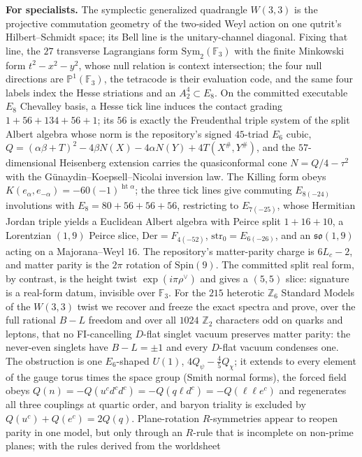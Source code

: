 \documentclass[11pt,twoside]{article}
\theoremstyle{plain}
\theoremstyle{definition}
\theoremstyle{remark}
\newcommand{\F}{\mathbb{F}}
\newcommand{\Z}{\mathbb{Z}}
\newcommand{\W}{W(3,3)}
\begin{document}
\medskip
\textbf{For specialists.} The symplectic generalized quadrangle $\W$ is the projective
commutation geometry of the two-sided Weyl action on one qutrit's Hilbert--Schmidt
space; its Bell line is the unitary-channel diagonal. Fixing that line, the
$27$ transverse Lagrangians form $\mathrm{Sym}_2(\F_3)$ with the finite Minkowski form
$t^2-x^2-y^2$, whose null relation is context intersection; the four null directions
are $\mathbb{P}^1(\F_3)$, the tetracode is their evaluation code, and the same four
labels index the Hesse striations and an $A_2^4\subset E_8$. On the committed
executable $E_8$ Chevalley basis, a Hesse tick line induces the contact grading
$1+56+134+56+1$; its $56$ is exactly the Freudenthal triple system of the split Albert
algebra whose norm is the repository's signed $45$-triad $E_6$ cubic,
$Q=(\alpha\beta+T)^2-4\beta N(X)-4\alpha N(Y)+4T(X^\#,Y^\#)$, and the $57$-dimensional
Heisenberg extension carries the quasiconformal cone $N=Q/4-\tau^2$ with the
G\"unaydin--Koepsell--Nicolai inversion law. The Killing form obeys
$K(e_\alpha,e_{-\alpha})=-60(-1)^{\operatorname{ht}\alpha}$; the three tick lines give
commuting $E_{8(-24)}$ involutions with $E_8=80+56+56+56$, restricting to $E_{7(-25)}$,
whose Hermitian Jordan triple yields a Euclidean Albert algebra with Peirce split
$1+16+10$, a Lorentzian $(1,9)$ Peirce slice, $\mathrm{Der}=F_{4(-52)}$,
$\mathrm{str}_0=E_{6(-26)}$, and an $\mathfrak{so}(1,9)$ acting on a Majorana--Weyl $16$.
The repository's matter-parity charge is $6L_c-2$, and matter parity is the $2\pi$
rotation of $\mathrm{Spin}(9)$. The committed split real form, by contrast, is the
height twist $\exp(i\pi\rho^\vee)$ and gives a $(5,5)$ slice: signature is a real-form
datum, invisible over $\F_3$. For the $215$ heterotic $\Z_6$ Standard Models of the $\W$
twist we recover and freeze the exact spectra and prove, over the full rational $B-L$
freedom and over all $1024$ $\Z_2$ characters odd on quarks and leptons, that no
FI-cancelling $D$-flat singlet vacuum preserves matter parity: the never-even singlets have
$B-L=\pm1$ and every $D$-flat vacuum condenses one. The obstruction is one $E_6$-shaped $U(1)$,
$4Q_\psi-\tfrac45Q_\chi$; it extends to every element of the gauge torus times the space group
(Smith normal forms), the forced field obeys $Q(n)=-Q(u^cd^cd^c)=-Q(q\ell d^c)=-Q(\ell\ell e^c)$ and
regenerates all three couplings at quartic order, and baryon triality is excluded by
$Q(u^c)+Q(e^c)=2Q(q)$. Plane-rotation $R$-symmetries appear to reopen parity in one model, but only
through an $R$-rule that is incomplete on non-prime planes; with the rules derived from the worldsheet
\end{document}

